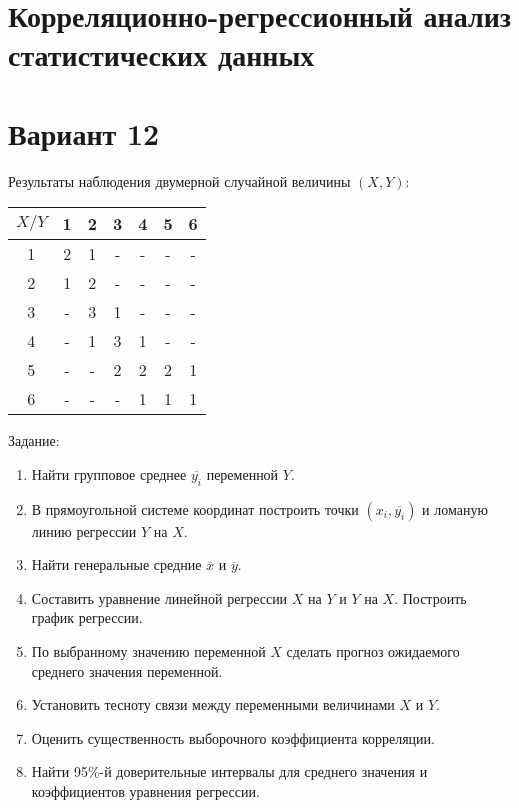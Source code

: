 \section*{Корреляционно-регрессионный анализ статистических данных}

\section*{Вариант 12}

Результаты наблюдения двумерной случайной величины $(X, Y)$:

\begin{center}
    \begin{tabular}{|c|c|c|c|c|c|c|}
        \hline
        $X/Y$ & 1 & 2 & 3 & 4 & 5 & 6 \\
        \hline
        1 & 2 & 1 & - & - & - & - \\
        \hline
        2 & 1 & 2 & - & - & - & - \\
        \hline
        3 & - & 3 & 1 & - & - & - \\
        \hline
        4 & - & 1 & 3 & 1 & - & - \\
        \hline
        5 & - & - & 2 & 2 & 2 & 1 \\
        \hline
        6 & - & - & - & 1 & 1 & 1 \\
        \hline
    \end{tabular}
\end{center}

Задание:

\begin{enumerate}
    \item Найти групповое среднее $\overline{y_i}$ переменной $Y$.
    \item В прямоугольной системе координат построить точки $(x_i, \overline{y_i})$ и ломаную линию регрессии $Y$ на $X$.
    \item Найти генеральные средние $\overline{x}$ и $\overline{y}$.
    \item Составить уравнение линейной регрессии $X$ на $Y$ и $Y$ на $X$. Построить график регрессии.
    \item По выбранному значению переменной $X$ сделать прогноз ожидаемого среднего значения переменной.
    \item Установить тесноту связи между переменными величинами $X$ и $Y$.
    \item Оценить существенность выборочного коэффициента корреляции.
    \item Найти 95\%-й доверительные интервалы для среднего значения и коэффициентов уравнения регрессии.
\end{enumerate}

